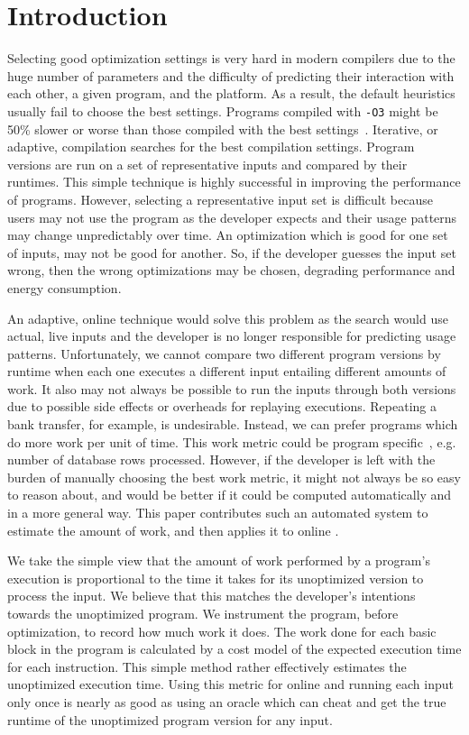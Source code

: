 \section{Introduction}

    Selecting good optimization settings is very hard in modern compilers due to the huge number of parameters and the difficulty
    of predicting their interaction with each other, a given program, and the platform. As a result, the default heuristics usually fail to
    choose the best settings. Programs compiled with \texttt{-O3} might be 50\% slower or worse than those compiled with the best
    settings~\cite{fursin07,chen12b}. Iterative, or adaptive, compilation searches for the best compilation settings. Program versions are run
    on a set of representative inputs and compared by their runtimes. This simple technique is highly successful in improving the
    performance of programs. However, selecting a representative input set is difficult because users may not use the program as the
    developer expects and their usage patterns may change unpredictably over time. An optimization which is good for one set of inputs, may
    not be good for another. So, if the developer guesses the input set wrong, then the wrong optimizations may be chosen, degrading
    performance and energy consumption.

    An adaptive, online technique would solve this problem as the search would use actual, live inputs and the developer is no longer
    responsible for predicting usage patterns. Unfortunately, we cannot compare two different program versions by runtime when each
    one executes a different input entailing different amounts of work.
    It also may not always be possible to run the inputs through both versions due to possible side effects or overheads for replaying
    executions.
    Repeating a bank transfer, for example, is undesirable. Instead, we can prefer programs which do more work per unit of time. This work
    metric could be program specific~\cite{alameldeen06,coppa14}, e.g. number of database rows processed.
    However, if the developer is left with the burden of manually choosing the best work metric, it might not always be so easy to reason
    about, and would be better if it could be computed automatically and in a more general way.
    This paper contributes such an automated system to estimate the amount of work, and then applies it to online {\itercomp}.

    We take the simple view that the amount of work performed by a program's execution is proportional to the time it takes for its
    unoptimized version to process the input.
    We believe that this matches the developer's intentions towards the unoptimized program.
    We instrument the program, before optimization, to record how much work it does. The work done for each basic block in the
    program is calculated by a cost model of the expected execution time for each instruction. This simple method rather effectively estimates
    the unoptimized execution time. Using this metric for online {\itercomp} and running each input only once is nearly as good as using an
    oracle which can cheat and get the true runtime of the unoptimized program version for any input.

